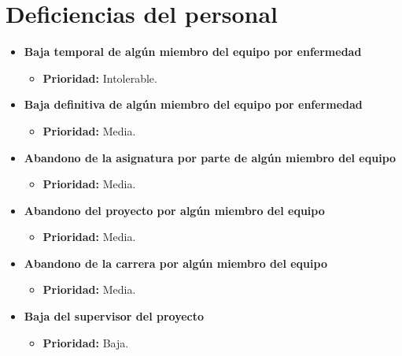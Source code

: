 \documentclass[spanish,a4paper,12pt]{report}	%
\begin{document}
%
\setcounter{section}{0}
\section{Deficiencias del personal}
	\begin{itemize}
		\item \textbf{Baja temporal de algún miembro del equipo por enfermedad}
			\begin{itemize}
				\item \textbf{Prioridad: }Intolerable.		%
			\end{itemize}
		
		\item \textbf{Baja definitiva de algún miembro del equipo por enfermedad}	
			\begin{itemize}
				\item \textbf{Prioridad: }Media.
			\end{itemize}
		
		\item \textbf{Abandono de la asignatura por parte de algún miembro del equipo}	
			\begin{itemize}
				\item \textbf{Prioridad: }Media.
			\end{itemize}
		
		\item \textbf{Abandono del proyecto por algún miembro del equipo}	
			\begin{itemize}
				\item \textbf{Prioridad: }Media.
			\end{itemize}
		
		\item \textbf{Abandono de la carrera por algún miembro del equipo}
			\begin{itemize}
				\item \textbf{Prioridad: }Media.
			\end{itemize}
		
		\item \textbf{Baja del supervisor del proyecto}
			\begin{itemize}
				\item \textbf{Prioridad: }Baja.
			\end{itemize}
	\end{itemize}
%
\end{document}
